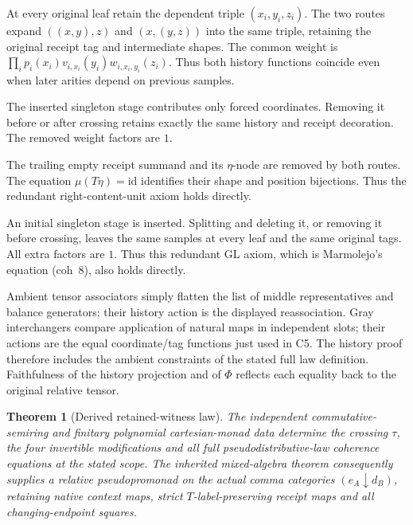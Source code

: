 \documentclass[11pt,a4paper]{article}
\newtheorem{theorem}{Theorem}[section]
\theoremstyle{definition}
\newcommand{\id}{\mathrm{id}}
\begin{document}
\begin{description}[style=nextline]
\item[C7 context associativity on $NMMM$.]
At every original leaf retain the dependent triple $(x_i,y_i,z_i)$.
The two routes expand $((x,y),z)$ and $(x,(y,z))$ into the same triple,
retaining the original receipt tag and intermediate shapes. The common
weight is
$\prod_i p_i(x_i)v_{i,x_i}(y_i)w_{i,x_i,y_i}(z_i)$.
Thus both history functions coincide even when later arities depend on
previous samples.

\item[C8 context right unit.]
The inserted singleton stage contributes only forced coordinates. Removing
it before or after crossing retains exactly the same history and receipt
decoration. The removed weight factors are $1$.

\item[C9 content right unit.]
The trailing empty receipt summand and its $\eta$-node are removed by both
routes. The equation $\mu(T\eta)=\id$ identifies their shape and position
bijections. Thus the redundant right-content-unit axiom holds directly.

\item[C10 context left unit.]
An initial singleton stage is inserted. Splitting and deleting it, or
removing it before crossing, leaves the same samples at every leaf and the
same original tags. All extra factors are $1$. Thus this redundant GL axiom,
which is Marmolejo's equation (coh~8), also holds directly.
\end{description}

Ambient tensor associators simply flatten the list of middle representatives
and balance generators; their history action is the displayed reassociation.
Gray interchangers compare application of natural maps in independent slots;
their actions are the equal coordinate/tag functions just used in C5.
The history proof therefore includes the ambient constraints of the stated
full law definition. Faithfulness of the history projection and of $\Phi$
reflects each equality back to the original relative tensor.

\begin{theorem}[Derived retained-witness law]\label{xc:theorem}
The independent commutative-semiring and finitary polynomial cartesian-monad
data determine the crossing $\tau$, the four invertible modifications and
all full pseudodistributive-law coherence equations at the stated scope.
The inherited mixed-algebra theorem consequently supplies a relative
pseudopromonad on the actual comma categories $(e_A\downarrow d_B)$,
retaining native context maps, strict $T$-label-preserving receipt maps and
all changing-endpoint squares.
\end{theorem}
\end{document}
